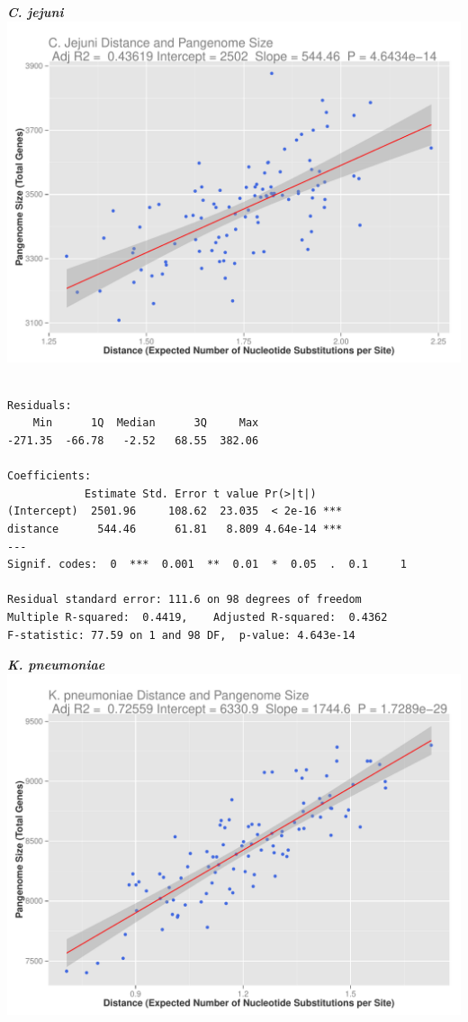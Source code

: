 \documentclass[12pt]{article}
\begin{document}
\newpage


{\large \textbf{\textit{C. jejuni}}\\}
\includegraphics[width=\textwidth]{campyl_plot.pdf}

\begin{lstlisting}

Residuals:
    Min      1Q  Median      3Q     Max 
-271.35  -66.78   -2.52   68.55  382.06 

Coefficients:
            Estimate Std. Error t value Pr(>|t|)    
(Intercept)  2501.96     108.62  23.035  < 2e-16 ***
distance      544.46      61.81   8.809 4.64e-14 ***
---
Signif. codes:  0  ***  0.001  **  0.01  *  0.05  .  0.1     1

Residual standard error: 111.6 on 98 degrees of freedom
Multiple R-squared:  0.4419,    Adjusted R-squared:  0.4362 
F-statistic: 77.59 on 1 and 98 DF,  p-value: 4.643e-14

\end{lstlisting}

\newpage 

{\large \textbf{\textit{K. pneumoniae}}\\}
\includegraphics[width=\textwidth]{pneumoplot.pdf}
\end{document}

